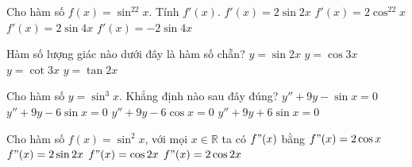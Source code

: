 \begin{ex}%
	Cho hàm  số $f(x)=\sin^22x$. Tính $f'(x)$.
	\choice 
		 {$f'(x)=2\sin2x$}
		 {$f'(x)=2\cos^22x$}
		{\True  $f'(x)=2\sin4x$}
		 {$f'(x)=-2\sin4x$}
\end{ex}

\begin{ex}%
	Hàm số  lượng giác nào dưới đây là hàm số chẵn?
	 \choice
		{$y=\sin  2x$}
		{\True $y=\cos  3x$}
		{$y=\cot  3x $}
		{$y=\tan 2x  $}
\end{ex}

\begin{ex}%
	 Cho hàm số $y=\sin^3x$. Khẳng định nào sau đây đúng?
	\choice 
		 {$y''+9y-\sin x=0$}
		{\True $y''+9y-6\sin x=0$} 
		{$y''+9y-6\cos  x=0$}
		{$y''+9y+6\sin x=0$} 
\end{ex}

\begin{ex}%
	Cho hàm số $f(x)=\sin^2x$, với mọi $x\in  \mathbb{R}$ ta có $f"(x)$ bằng
	\choice 
		{$f"(x)=2\cos x$} 
		 {$f"(x)=2\sin 2x$}
		 {$f"(x)=\cos 2x$}
		{\True $f"(x)=2\cos  2x$}
\end{ex}
